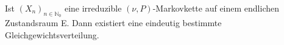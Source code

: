 Ist $(X_{n})_{n \in \mathbb{N}_{0}}$ eine irreduzible $(\nu,P)$-Markovkette auf einem endlichen Zustandsraum E. Dann existiert eine eindeutig bestimmte Gleichgewichtsverteilung.